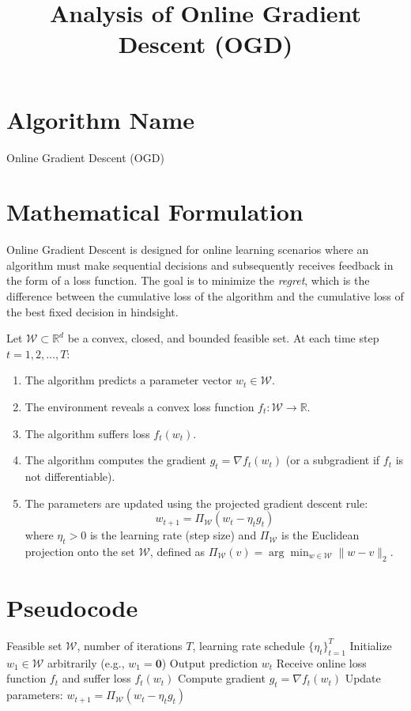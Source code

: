 \documentclass[11pt]{article}
\title{Analysis of Online Gradient Descent (OGD)}
\author{}
\date{}
\begin{document}
\maketitle

\section*{Algorithm Name}
Online Gradient Descent (OGD)

\section*{Mathematical Formulation}
Online Gradient Descent is designed for online learning scenarios where an algorithm must make sequential decisions and subsequently receives feedback in the form of a loss function. The goal is to minimize the \textit{regret}, which is the difference between the cumulative loss of the algorithm and the cumulative loss of the best fixed decision in hindsight.

Let $\mathcal{W} \subset \mathbb{R}^d$ be a convex, closed, and bounded feasible set. At each time step $t = 1, 2, \dots, T$:
\begin{enumerate}
    \item The algorithm predicts a parameter vector $w_t \in \mathcal{W}$.
    \item The environment reveals a convex loss function $f_t : \mathcal{W} \to \mathbb{R}$.
    \item The algorithm suffers loss $f_t(w_t)$.
    \item The algorithm computes the gradient $g_t = \nabla f_t(w_t)$ (or a subgradient if $f_t$ is not differentiable).
    \item The parameters are updated using the projected gradient descent rule:
    $$w_{t+1} = \Pi_{\mathcal{W}}(w_t - \eta_t g_t)$$
    where $\eta_t > 0$ is the learning rate (step size) and $\Pi_{\mathcal{W}}$ is the Euclidean projection onto the set $\mathcal{W}$, defined as $\Pi_{\mathcal{W}}(v) = \arg\min_{w \in \mathcal{W}} \|w - v\|_2$.
\end{enumerate}

\section*{Pseudocode}
\begin{algorithm}[H]
\caption{Online Gradient Descent}
\begin{algorithmic}[1]
\REQUIRE Feasible set $\mathcal{W}$, number of iterations $T$, learning rate schedule $\{\eta_t\}_{t=1}^T$
\STATE Initialize $w_1 \in \mathcal{W}$ arbitrarily (e.g., $w_1 = \mathbf{0}$)
    \STATE Output prediction $w_t$
    \STATE Receive online loss function $f_t$ and suffer loss $f_t(w_t)$
    \STATE Compute gradient $g_t = \nabla f_t(w_t)$
    \STATE Update parameters: $w_{t+1} = \Pi_{\mathcal{W}}(w_t - \eta_t g_t)$
\ENDFOR
\end{algorithmic}
\end{algorithm}
\end{document}
